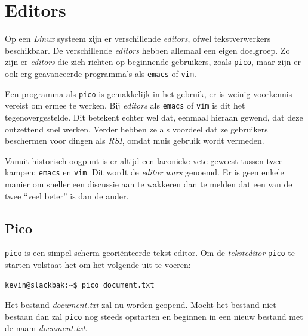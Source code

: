 %
%
%
%

\chapter{Editors}
Op een \emph{Linux} systeem zijn er verschillende \emph{editors}, ofwel tekstverwerkers beschikbaar. De verschillende \emph{editors} hebben allemaal een eigen doelgroep. Zo zijn er \emph{editors} die zich richten op beginnende gebruikers, zoals \texttt{pico}, maar zijn er ook erg geavanceerde programma's als \texttt{emacs} of \texttt{vim}. 

Een programma als \texttt{pico} is gemakkelijk in het gebruik, er is weinig voorkennis vereist om ermee te werken. Bij \emph{editors} als \texttt{emacs} of \texttt{vim} is dit het tegenovergestelde. Dit betekent echter wel dat, eenmaal hieraan gewend, dat deze ontzettend snel werken. Verder hebben ze als voordeel dat ze gebruikers beschermen voor dingen als \emph{RSI}, omdat muis gebruik wordt vermeden. 

Vanuit historisch oogpunt is er altijd een laconieke vete geweest tussen twee kampen; \texttt{emacs} en \texttt{vim}. Dit wordt de \emph{editor wars} genoemd. Er is geen enkele manier om sneller een discussie aan te wakkeren dan te melden dat een van de twee ``veel beter'' is dan de ander.

\section{Pico}
\texttt{pico} is een simpel scherm geori\"{e}nteerde tekst editor. Om de \emph{teksteditor} \texttt{pico} te starten volstaat het om het volgende uit te voeren: 
\begin{lstlisting}
kevin@slackbak:~$ pico document.txt
\end{lstlisting}%
Het bestand \emph{document.txt} zal nu worden geopend. Mocht het bestand niet bestaan dan zal \texttt{pico} nog steeds opstarten en beginnen in een nieuw bestand met de naam \emph{document.txt}.

